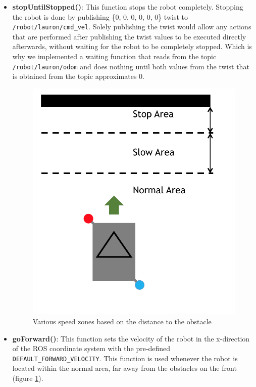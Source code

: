 \begin{itemize}
\item \textbf{stopUntilStopped()}: \label{item:stopUntilStopped}
This function stops the robot completely. Stopping the robot is done by publishing \{0, 0, 0, 0, 0, 0\} twist to \texttt{/robot/lauron/cmd\_vel}. Solely publishing the twist would allow any actions that are performed after publishing the twist values to be executed directly afterwards, without waiting for the robot to be completely stopped. Which is why we implemented a waiting function that reads from the topic \texttt{/robot/lauron/odom} and does nothing until both values from the twist that is obtained from the topic approximates 0.

\begin{figure}[htb]
\centering
\includegraphics[scale=0.6]{graphics/Zone.png}
\caption{Various speed zones based on the distance to the obstacle}
\label{Zone}
\centering
\end{figure}


\item \textbf{goForward()}: \label{item:goForward}
This function sets the velocity of the robot in the x-direction of the ROS coordinate system with the pre-defined \texttt{DEFAULT\_FORWARD\_VELOCITY}. This function is used whenever the robot is located within the normal area, far away from the obstacles on the front (figure \ref{Zone}).


\end{itemize}
